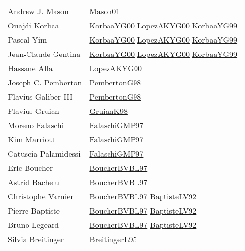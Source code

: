 {\begin{longtable}{p{4cm}p{15cm}}
Andrew J. Mason & \href{articles/Mason01.pdf}{Mason01}\cite{Mason01} \\
Ouajdi Korbaa & \href{articles/KorbaaYG00.pdf}{KorbaaYG00}\cite{KorbaaYG00} \href{articles/LopezAKYG00.pdf}{LopezAKYG00}\cite{LopezAKYG00} \href{papers/KorbaaYG99.pdf}{KorbaaYG99}\cite{KorbaaYG99} \\
Pascal Yim & \href{articles/KorbaaYG00.pdf}{KorbaaYG00}\cite{KorbaaYG00} \href{articles/LopezAKYG00.pdf}{LopezAKYG00}\cite{LopezAKYG00} \href{papers/KorbaaYG99.pdf}{KorbaaYG99}\cite{KorbaaYG99} \\
Jean{-}Claude Gentina & \href{articles/KorbaaYG00.pdf}{KorbaaYG00}\cite{KorbaaYG00} \href{articles/LopezAKYG00.pdf}{LopezAKYG00}\cite{LopezAKYG00} \href{papers/KorbaaYG99.pdf}{KorbaaYG99}\cite{KorbaaYG99} \\
Hassane Alla & \href{articles/LopezAKYG00.pdf}{LopezAKYG00}\cite{LopezAKYG00} \\
Joseph C. Pemberton & \href{papers/PembertonG98.pdf}{PembertonG98}\cite{PembertonG98} \\
Flavius Galiber III & \href{papers/PembertonG98.pdf}{PembertonG98}\cite{PembertonG98} \\
Flavius Gruian & \href{papers/GruianK98.pdf}{GruianK98}\cite{GruianK98} \\
Moreno Falaschi & \href{articles/FalaschiGMP97.pdf}{FalaschiGMP97}\cite{FalaschiGMP97} \\
Kim Marriott & \href{articles/FalaschiGMP97.pdf}{FalaschiGMP97}\cite{FalaschiGMP97} \\
Catuscia Palamidessi & \href{articles/FalaschiGMP97.pdf}{FalaschiGMP97}\cite{FalaschiGMP97} \\
Eric Boucher & \href{papers/BoucherBVBL97.pdf}{BoucherBVBL97}\cite{BoucherBVBL97} \\
Astrid Bachelu & \href{papers/BoucherBVBL97.pdf}{BoucherBVBL97}\cite{BoucherBVBL97} \\
Christophe Varnier & \href{papers/BoucherBVBL97.pdf}{BoucherBVBL97}\cite{BoucherBVBL97} \href{papers/BaptisteLV92.pdf}{BaptisteLV92}\cite{BaptisteLV92} \\
Pierre Baptiste & \href{papers/BoucherBVBL97.pdf}{BoucherBVBL97}\cite{BoucherBVBL97} \href{papers/BaptisteLV92.pdf}{BaptisteLV92}\cite{BaptisteLV92} \\
Bruno Legeard & \href{papers/BoucherBVBL97.pdf}{BoucherBVBL97}\cite{BoucherBVBL97} \href{papers/BaptisteLV92.pdf}{BaptisteLV92}\cite{BaptisteLV92} \\
Silvia Breitinger & \href{}{BreitingerL95}\cite{BreitingerL95} \\

\end{longtable}}
